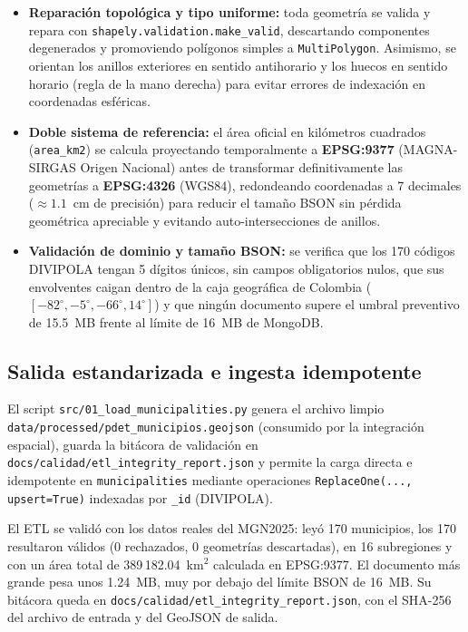 \documentclass[12pt, letterpaper]{article}
\begin{document}
\begin{itemize}
  \item \textbf{Reparación topológica y tipo uniforme:} toda geometría se valida y repara con \texttt{shapely.validation.make\_valid}, descartando componentes degenerados y promoviendo polígonos simples a \texttt{MultiPolygon}. Asimismo, se orientan los anillos exteriores en sentido antihorario y los huecos en sentido horario (regla de la mano derecha) para evitar errores de indexación en coordenadas esféricas.
  \item \textbf{Doble sistema de referencia:} el área oficial en kilómetros cuadrados (\texttt{area\_km2}) se calcula proyectando temporalmente a \textbf{EPSG:9377} (MAGNA-SIRGAS Origen Nacional) antes de transformar definitivamente las geometrías a \textbf{EPSG:4326} (WGS84), redondeando coordenadas a 7 decimales ($\approx 1.1$~cm de precisión) para reducir el tamaño BSON sin pérdida geométrica apreciable y evitando auto-intersecciones de anillos.
  \newpage
  \item \textbf{Validación de dominio y tamaño BSON:} se verifica que los 170 códigos DIVIPOLA tengan 5 dígitos únicos, sin campos obligatorios nulos, que sus envolventes caigan dentro de la caja geográfica de Colombia ($[-82^\circ, -5^\circ, -66^\circ, 14^\circ]$) y que ningún documento supere el umbral preventivo de 15.5~MB frente al límite de 16~MB de MongoDB.
\end{itemize}

\subsection{Salida estandarizada e ingesta idempotente}
El script \texttt{src/01\_load\_municipalities.py} genera el archivo limpio \texttt{data/processed/pdet\_municipios.geojson} (consumido por la integración espacial), guarda la bitácora de validación en \texttt{docs/calidad/etl\_integrity\_report.json} y permite la carga directa e idempotente en \texttt{municipalities} mediante operaciones \texttt{ReplaceOne(..., upsert=True)} indexadas por \texttt{\_id} (DIVIPOLA).

El ETL se validó con los datos reales del MGN2025: leyó 170 municipios, los 170 resultaron válidos (0 rechazados, 0 geometrías descartadas), en 16 subregiones y con un área total de 389\,182.04~km$^2$ calculada en EPSG:9377. El documento más grande pesa unos 1.24~MB, muy por debajo del límite BSON de 16~MB. Su bitácora queda en \texttt{docs/calidad/etl\_integrity\_report.json}, con el SHA-256 del archivo de entrada y del GeoJSON de salida.
\end{document}
